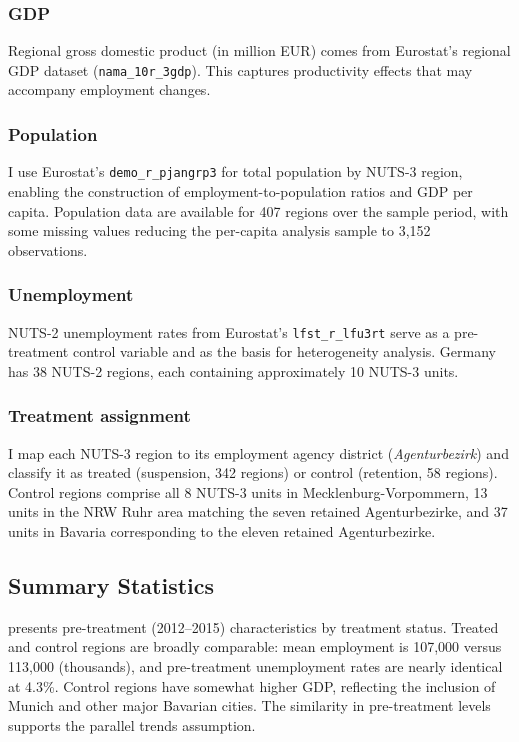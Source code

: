\documentclass[12pt]{article}
\begin{document}
\subsubsection*{GDP} Regional gross domestic product (in million EUR) comes from Eurostat's regional GDP dataset (\texttt{nama\_10r\_3gdp}). This captures productivity effects that may accompany employment changes.

\subsubsection*{Population} I use Eurostat's \texttt{demo\_r\_pjangrp3} for total population by NUTS-3 region, enabling the construction of employment-to-population ratios and GDP per capita. Population data are available for 407 regions over the sample period, with some missing values reducing the per-capita analysis sample to 3,152 observations.

\subsubsection*{Unemployment} NUTS-2 unemployment rates from Eurostat's \texttt{lfst\_r\_lfu3rt} serve as a pre-treatment control variable and as the basis for heterogeneity analysis. Germany has 38 NUTS-2 regions, each containing approximately 10 NUTS-3 units.

\subsubsection*{Treatment assignment} I map each NUTS-3 region to its employment agency district (\textit{Agenturbezirk}) and classify it as treated (suspension, 342 regions) or control (retention, 58 regions). Control regions comprise all 8 NUTS-3 units in Mecklenburg-Vorpommern, 13 units in the NRW Ruhr area matching the seven retained Agenturbezirke, and 37 units in Bavaria corresponding to the eleven retained Agenturbezirke.

\subsection{Summary Statistics}

 presents pre-treatment (2012--2015) characteristics by treatment status. Treated and control regions are broadly comparable: mean employment is 107,000 versus 113,000 (thousands), and pre-treatment unemployment rates are nearly identical at 4.3\%. Control regions have somewhat higher GDP, reflecting the inclusion of Munich and other major Bavarian cities. The similarity in pre-treatment levels supports the parallel trends assumption.
\end{document}
